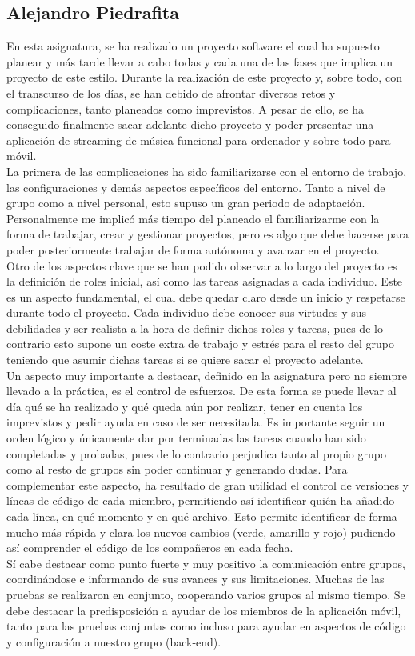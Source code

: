 \documentclass{article}
\begin{document}
\subsection*{Alejandro Piedrafita}
En esta asignatura, se ha realizado un proyecto software el cual ha supuesto planear y más tarde llevar a cabo todas y cada una de las fases que implica un proyecto de este estilo. Durante la realización de este proyecto y, sobre todo, con el transcurso de los días, se han debido de afrontar diversos retos y complicaciones, tanto planeados como imprevistos. A pesar de ello, se ha conseguido finalmente sacar adelante dicho proyecto y poder presentar una aplicación de streaming de música funcional para ordenador y sobre todo para móvil.\\
\hfill \break
La primera de las complicaciones ha sido familiarizarse con el entorno de trabajo, las configuraciones y demás aspectos específicos del entorno. Tanto a nivel de grupo como a nivel personal, esto supuso un gran periodo de adaptación. Personalmente me implicó más tiempo del planeado el familiarizarme con la forma de trabajar, crear y gestionar proyectos, pero es algo que debe hacerse para poder posteriormente trabajar de forma autónoma y avanzar en el proyecto.\\
\hfill \break
Otro de los aspectos clave que se han podido observar a lo largo del proyecto es la definición de roles inicial, así como las tareas asignadas a cada individuo. Este es un aspecto fundamental, el cual debe quedar claro desde un inicio y respetarse durante todo el proyecto. Cada individuo debe conocer sus virtudes y sus debilidades y ser realista a la hora de definir dichos roles y tareas, pues de lo contrario esto supone un coste extra de trabajo y estrés para el resto del grupo teniendo que asumir dichas tareas si se quiere sacar el proyecto adelante.\\
\hfill \break
Un aspecto muy importante a destacar, definido en la asignatura pero no siempre llevado a la práctica, es el control de esfuerzos. De esta forma se puede llevar al día qué se ha realizado y qué queda aún por realizar, tener en cuenta los imprevistos y pedir ayuda en caso de ser necesitada. Es importante seguir un orden lógico y únicamente dar por terminadas las tareas cuando han sido completadas y probadas, pues de lo contrario perjudica tanto al propio grupo como al resto de grupos sin poder continuar y generando dudas. Para complementar este aspecto, ha resultado de gran utilidad el control de versiones y líneas de código de cada miembro, permitiendo así identificar quién ha añadido cada línea, en qué momento y en qué archivo. Esto permite identificar de forma mucho más rápida y clara los nuevos cambios (verde, amarillo y rojo) pudiendo así comprender el código de los compañeros en cada fecha.\\
\hfill \break
Sí cabe destacar como punto fuerte y muy positivo la comunicación entre grupos, coordinándose e informando de sus avances y sus limitaciones. Muchas de las pruebas se realizaron en conjunto, cooperando varios grupos al mismo tiempo. Se debe destacar la predisposición a ayudar de los miembros de la aplicación móvil, tanto para las pruebas conjuntas como incluso para ayudar en aspectos de código y configuración a nuestro grupo (back-end).
\end{document}
